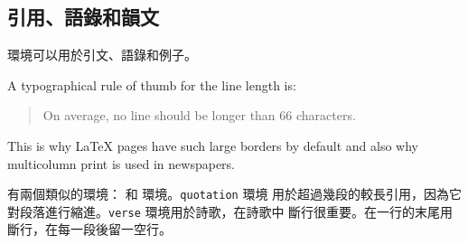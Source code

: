 \subsection{引用、語錄和韻文}

 環境可以用於引文、語錄和例子。
\begin{example}
A typographical rule of thumb
for the line length is:
\begin{quote}
On average, no line should
be longer than 66 characters.
\end{quote}
This is why \LaTeX{} pages have
such large borders by default
and also why multicolumn print
is used in newspapers.
\end{example}

有兩個類似的環境： 和  環境。\texttt{quotation} 環境
用於超過幾段的較長引用，因為它對段落進行縮進。\texttt{verse} 環境用於詩歌，在詩歌中
斷行很重要。在一行的末尾用 \ci{\bs} 斷行，在每一段後留一空行。


